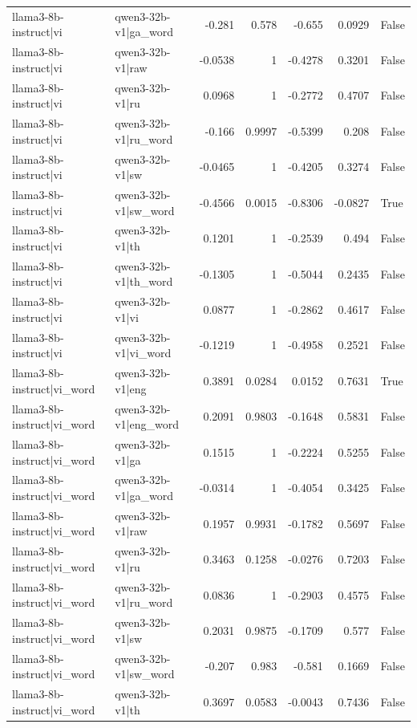\begin{table}
\begin{tabular}{l l r r r r l}
llama3-8b-instruct|vi & qwen3-32b-v1|ga_word & -0.281 & 0.578 & -0.655 & 0.0929 & False \\
llama3-8b-instruct|vi & qwen3-32b-v1|raw & -0.0538 & 1 & -0.4278 & 0.3201 & False \\
llama3-8b-instruct|vi & qwen3-32b-v1|ru & 0.0968 & 1 & -0.2772 & 0.4707 & False \\
llama3-8b-instruct|vi & qwen3-32b-v1|ru_word & -0.166 & 0.9997 & -0.5399 & 0.208 & False \\
llama3-8b-instruct|vi & qwen3-32b-v1|sw & -0.0465 & 1 & -0.4205 & 0.3274 & False \\
llama3-8b-instruct|vi & qwen3-32b-v1|sw_word & -0.4566 & 0.0015 & -0.8306 & -0.0827 & True \\
llama3-8b-instruct|vi & qwen3-32b-v1|th & 0.1201 & 1 & -0.2539 & 0.494 & False \\
llama3-8b-instruct|vi & qwen3-32b-v1|th_word & -0.1305 & 1 & -0.5044 & 0.2435 & False \\
llama3-8b-instruct|vi & qwen3-32b-v1|vi & 0.0877 & 1 & -0.2862 & 0.4617 & False \\
llama3-8b-instruct|vi & qwen3-32b-v1|vi_word & -0.1219 & 1 & -0.4958 & 0.2521 & False \\
llama3-8b-instruct|vi_word & qwen3-32b-v1|eng & 0.3891 & 0.0284 & 0.0152 & 0.7631 & True \\
llama3-8b-instruct|vi_word & qwen3-32b-v1|eng_word & 0.2091 & 0.9803 & -0.1648 & 0.5831 & False \\
llama3-8b-instruct|vi_word & qwen3-32b-v1|ga & 0.1515 & 1 & -0.2224 & 0.5255 & False \\
llama3-8b-instruct|vi_word & qwen3-32b-v1|ga_word & -0.0314 & 1 & -0.4054 & 0.3425 & False \\
llama3-8b-instruct|vi_word & qwen3-32b-v1|raw & 0.1957 & 0.9931 & -0.1782 & 0.5697 & False \\
llama3-8b-instruct|vi_word & qwen3-32b-v1|ru & 0.3463 & 0.1258 & -0.0276 & 0.7203 & False \\
llama3-8b-instruct|vi_word & qwen3-32b-v1|ru_word & 0.0836 & 1 & -0.2903 & 0.4575 & False \\
llama3-8b-instruct|vi_word & qwen3-32b-v1|sw & 0.2031 & 0.9875 & -0.1709 & 0.577 & False \\
llama3-8b-instruct|vi_word & qwen3-32b-v1|sw_word & -0.207 & 0.983 & -0.581 & 0.1669 & False \\
llama3-8b-instruct|vi_word & qwen3-32b-v1|th & 0.3697 & 0.0583 & -0.0043 & 0.7436 & False \\

\end{tabular}
\end{table}
